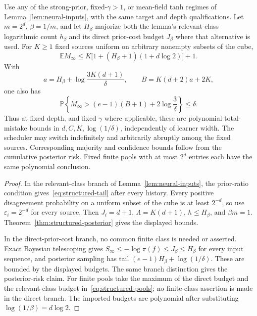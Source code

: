 \begin{corollary}
\label{cor:structured-neural}
Use any of the strong-prior, fixed-$\gamma>1$, or mean-field tanh regimes
of Lemma~\ref{lem:neural-inputs}, with the same target and depth
qualifications. Let $m=2^d$, $\beta=1/m$, and let $H_\beta$ majorize both
the lemma's relevant-class logarithmic count $h_\beta$ and its direct
prior-cost budget $J_\beta$ where that alternative is used. For $K\ge1$
fixed sources uniform on arbitrary nonempty subsets of the cube,
\begin{equation}\label{eq:structured-neural-expectation}
 \mathbb E M_\infty\le
 K\bigl[1+(H_\beta+1)(1+d\log2)\bigr]+1.
\end{equation}
With
\[
 a=H_\beta+\log\frac{3K(d+1)}\delta,
 \qquad B=K(d+2)a+2K,
\]
one also has
\begin{equation}\label{eq:structured-neural-tail}
 \mathbb P\left\{M_\infty>
 (e-1)(B+1)+2\log\frac3\delta\right\}\le\delta.
\end{equation}
Thus at fixed depth, and fixed $\gamma$ where applicable, these are
polynomial total-mistake bounds in $d,C,K,\log(1/\delta)$, independently
of learner width. The scheduler may switch indefinitely and arbitrarily
abruptly among the fixed sources. Corresponding majority and confidence
bounds follow from the cumulative posterior risk. Fixed finite pools
with at most $2^d$ entries each have the same polynomial conclusion.
\end{corollary}

\begin{proof}
In the relevant-class branch of Lemma~\ref{lem:neural-inputs}, the
prior-ratio condition gives~\eqref{eq:structured-tail} after every
history. Every positive disagreement probability on a uniform subset of
the cube is at least $2^{-d}$, so use $\varepsilon_i=2^{-d}$ for every
source. Then $J_i=d+1$, $\Lambda=K(d+1)$, $h\le H_\beta$, and
$\beta m=1$. Theorem~\ref{thm:structured-posterior} gives the displayed
bounds.

In the direct-prior-cost branch, no common finite class is needed or
asserted. Exact Bayesian telescoping gives
$S_\infty\le-\log\pi(f)\le J_\beta\le H_\beta$ for every input sequence,
and posterior sampling has tail
$(e-1)H_\beta+\log(1/\delta)$. These are bounded by the displayed budgets.
The same branch distinction gives the posterior-risk claim. For finite
pools take the maximum of the direct budget and the relevant-class
budget in~\eqref{eq:structured-pools}; no finite-class assertion is made
in the direct branch. The imported budgets are polynomial after substituting
$\log(1/\beta)=d\log2$.
\end{proof}

